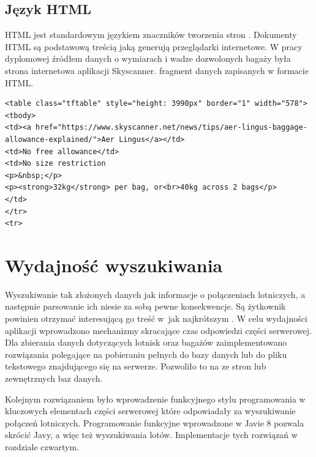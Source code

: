 \documentclass[12pt, twoside]{report}
\begin{document}
\subsection{Język HTML}
HTML jest standardowym językiem znaczników  tworzenia stron . Dokumenty HTML są podstawową treścią jaką generują przeglądarki internetowe. W pracy dyplomowej źródłem danych o wymiarach i wadze dozwolonych bagaży była strona internetowa aplikacji Skyscanner\cite{html}.  fragment  danych zapisanych w formacie HTML.
\begin{lstlisting}[language=HTML5, caption= Fragment dokumentu HTML, label=lst::html]
<table class="tftable" style="height: 3990px" border="1" width="578">
<tbody>
<td><a href="https://www.skyscanner.net/news/tips/aer-lingus-baggage-allowance-explained/">Aer Lingus</a></td>
<td>No free allowance</td>
<td>No size restriction
<p>&nbsp;</p>
<p><strong>32kg</strong> per bag, or<br>40kg across 2 bags</p>
</td>
</tr>
<tr>
\end{lstlisting}

\section{Wydajność wyszukiwania}
Wyszukiwanie tak złożonych danych jak informacje o połączeniach lotniczych, a następnie parsowanie ich\add{,} niesie za sobą pewne konsekwencje. Są  żytkownik powinien otrzymać interesującą go treść w~jak najkrótszym . W celu  wydajności aplikacji wprowadzono mechanizmy skracające czas odpowiedzi części serwerowej.
Dla zbierania danych dotyczących lotnisk oraz bagażów zaimplementowano rozwiązania polegające na pobieraniu pełnych  do bazy danych lub do pliku tekstowego znajdującego się na serwerze. Pozwoliło to na  ze stron lub zewnętrznych baz danych.

Kolejnym rozwiązaniem było wprowadzenie funkcyjnego stylu programowania w kluczowych elementach części serwerowej\add{,} które odpowiadały za wyszukiwanie połączeń lotniczych.  Programowanie funkcyjne wprowadzone w Javie 8 pozwala skrócić   Javy, a więc też  wyszukiwania lotów.
Implementacje tych rozwiązań  w rozdziale czwartym.
\end{document}
